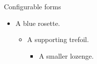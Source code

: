 \documentclass[handout]{beamer}
\begin{document}
\begin{frame}{Configurable forms}
\begin{itemize}\item<1-> A blue rosette.\begin{itemize}\item<2-> A supporting trefoil.\begin{itemize}\item A smaller lozenge.\end{itemize}\end{itemize}\end{itemize}
\floraldivider
\end{frame}
\end{document}
